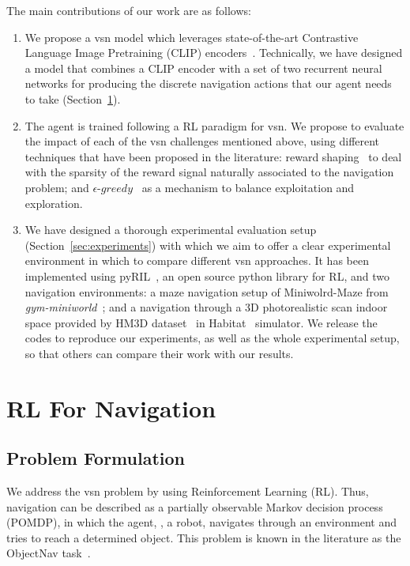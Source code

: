 The main contributions of our work are as follows:
\begin{enumerate}
 \item We propose a \acrshort{vsn} model which leverages state-of-the-art Contrastive Language Image Pretraining (CLIP) encoders~\cite{radford2021}.
Technically, we have designed a model that combines a CLIP encoder with a set of two recurrent neural networks for producing the discrete navigation actions that our agent needs to take (Section~\ref{sec:navigation}).
  \item The agent is trained following a RL paradigm for \acrshort{vsn}. We propose to evaluate the impact of each of the \acrshort{vsn} challenges mentioned above, using different techniques that have been proposed in the literature: reward shaping~\cite{sutton2018, wijmans2020} to deal with the sparsity of the reward signal naturally associated to the navigation problem; and $\epsilon\text{-}greedy$~\cite{mnih2013} as a mechanism to balance exploitation and exploration.
  \item We have designed a thorough experimental evaluation setup (Section~\ref{sec:experiments}) with which we aim to offer a clear experimental environment in which to compare different \acrshort{vsn} approaches.
 It has been implemented using pyRIL~\cite{pyRIL}, an open source python library for RL, and two navigation environments: a maze navigation setup of Miniwolrd-Maze from \textit{gym-miniworld}~\cite{gym_miniworld}; and a navigation through a 3D photorealistic scan indoor space provided by HM3D dataset~\cite{ramakrishnan2021} in Habitat~\cite{szot2021} simulator.
 We release the codes to reproduce our experiments, as well as the whole experimental setup, so that others can compare their work with our results.
\end{enumerate}
\section{RL For Navigation}\label{sec:navigation}

\subsection{Problem Formulation}\label{subsec:problem-formulation}

We address the \acrshort{vsn} problem by using Reinforcement Learning (RL).
Thus, navigation can be described as a partially observable Markov decision process (POMDP), in which the agent, \ie, a robot, navigates through an environment and tries to reach a determined object.
This problem is known in the literature as the ObjectNav task~\cite{batra2020}.

